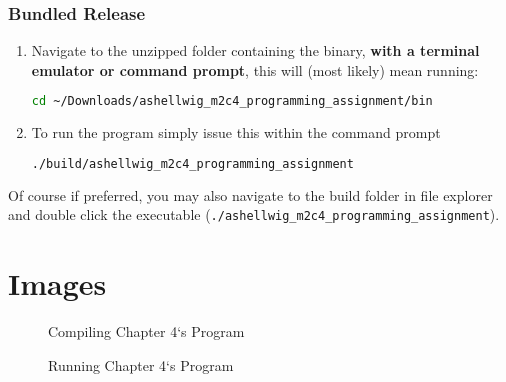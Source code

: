 \documentclass[a4paper, 11pt]{article}
\begin{document}
      \subsubsection{Bundled Release}
        \begin{enumerate}
          \item Navigate to the unzipped folder containing the binary,
            \textbf{with a terminal emulator or command prompt}, this will
            (most likely) mean running:
            \begin{lstlisting}[language=bash]
cd ~/Downloads/ashellwig_m2c4_programming_assignment/bin
            \end{lstlisting}
          \item To run the program simply issue this within the command
            prompt
            \begin{lstlisting}[language=bash]
./build/ashellwig_m2c4_programming_assignment
            \end{lstlisting}
        \end{enumerate}
        Of course if preferred, you may also navigate to the build folder in
          file explorer and double click the executable
          (\texttt{./ashellwig\_m2c4\_programming\_assignment}).


  \appendix
  \newpage
  \section{Images}\label{appendix:img}
    \begin{figure}[H]
      \caption{Compiling Chapter 4`s Program}
      \label{img:compilation}
    \end{figure}
    \begin{figure}[H]
      \caption{Running Chapter 4`s Program}
      \label{img:running}
    \end{figure}
\end{document}

